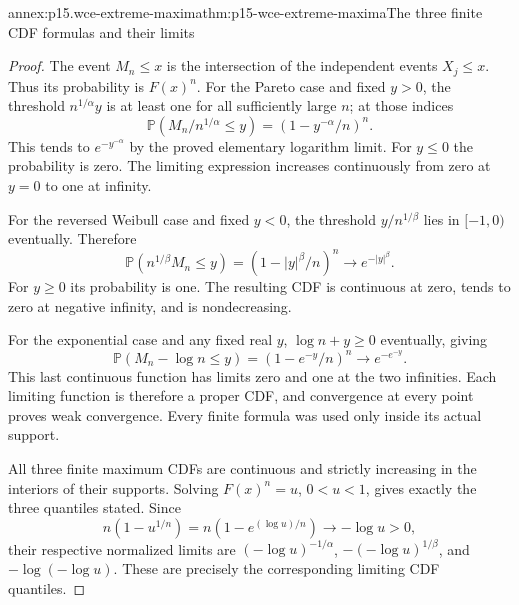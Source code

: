 \begin{annexitem}{annex:p15.wce-extreme-maxima}{thm:p15-wce-extreme-maxima}{The three finite CDF formulas and their limits}
\begin{proof}
The event \(M_n\leq x\) is the intersection of the independent
events \(X_j\leq x\). Thus its probability is \(F(x)^n\).
For the Pareto case and fixed \(y>0\), the threshold
\(n^{1/\alpha}y\) is at least one for all sufficiently large \(n\);
at those indices
\[
 \mathbb P(M_n/n^{1/\alpha}\leq y)
                         =(1-y^{-\alpha}/n)^n.
 \]
This tends to \(e^{-y^{-\alpha}}\) by the proved elementary
logarithm limit. For \(y\leq0\) the probability is zero.
The limiting expression increases continuously from zero at
\(y=0\) to one at infinity.

For the reversed Weibull case and fixed \(y<0\), the threshold
\(y/n^{1/\beta}\) lies in \([-1,0)\) eventually. Therefore
\[
 \mathbb P(n^{1/\beta}M_n\leq y)=(1-|y|^\beta/n)^n
                                  \longrightarrow e^{-|y|^\beta}.
 \]
For \(y\geq0\) its probability is one. The resulting CDF
is continuous at zero, tends to zero at negative infinity,
and is nondecreasing.

For the exponential case and any fixed real \(y\),
\(\log n+y\geq0\) eventually, giving
\[
 \mathbb P(M_n-\log n\leq y)=(1-e^{-y}/n)^n
                                  \longrightarrow e^{-e^{-y}}.
 \]
This last continuous function has limits zero and one at the
two infinities. Each limiting function is therefore a proper
CDF, and convergence at every point proves weak convergence.
Every finite formula was used only inside its actual support.

All three finite maximum CDFs are continuous and strictly
increasing in the interiors of their supports.
Solving \(F(x)^n=u\), \(0<u<1\), gives exactly the three
quantiles stated. Since
\[
 n(1-u^{1/n})=n(1-e^{(\log u)/n})\longrightarrow-\log u>0,
 \]
their respective normalized limits are
\((-\log u)^{-1/\alpha}\), \(-(-\log u)^{1/\beta}\), and
\(-\log(-\log u)\). These are precisely the corresponding
limiting CDF quantiles.
\end{proof}
\end{annexitem}

